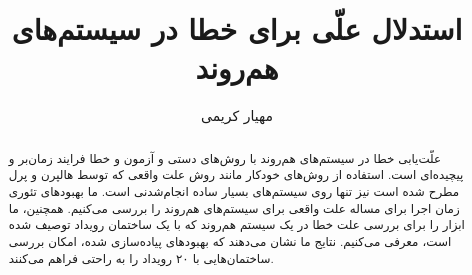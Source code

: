 \documentclass{article}
\title{استدلال علّی برای خطا در سیستم‌های هم‌روند}
\author{مهیار کریمی}
\theoremstyle{definition}
\theoremstyle{remark}
\begin{document}
\maketitle

\begin{abstract}
  علّت‌یابی خطا در سیستم‌های هم‌روند با
  روش‌های دستی و آزمون و خطا فرایند زمان‌بر
  و پیچیده‌ای است. استفاده از روش‌های
  خودکار مانند روش علت واقعی که توسط
  هالپرن و پرل مطرح شده است نیز تنها
  روی سیستم‌های بسیار ساده انجام‌شدنی است.
  ما بهبودهای تئوری زمان اجرا برای مساله علت واقعی
  برای سیستم‌های هم‌روند را بررسی می‌کنیم.
  همچنین، ما ابزار
  را برای بررسی علت خطا در یک سیستم هم‌روند
  که با یک ساختمان رویداد توصیف شده است، معرفی می‌کنیم.
  نتایج ما نشان می‌دهند که بهبودهای پیاده‌سازی شده،
  امکان بررسی ساختمان‌هایی با ۲۰ رویداد را
  به راحتی فراهم می‌کنند.
\end{abstract}








\end{document}
